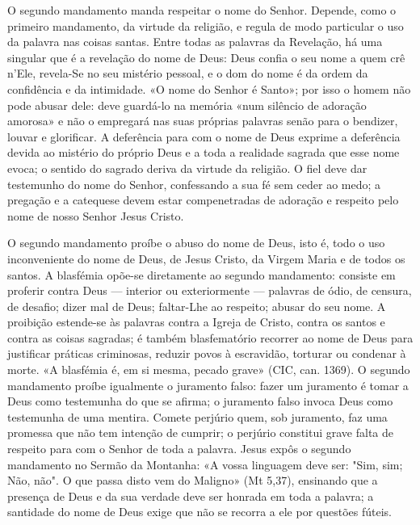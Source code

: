 O segundo mandamento manda respeitar o nome do Senhor. Depende, como o primeiro mandamento, da virtude da religião, e regula de modo particular o uso da palavra nas coisas santas. Entre todas as palavras da Revelação, há uma singular que é a revelação do nome de Deus: Deus confia o seu nome a quem crê n'Ele, revela-Se no seu mistério pessoal, e o dom do nome é da ordem da confidência e da intimidade. «O nome do Senhor é Santo»; por isso o homem não pode abusar dele: deve guardá-lo na memória «num silêncio de adoração amorosa» e não o empregará nas suas próprias palavras senão para o bendizer, louvar e glorificar. A deferência para com o nome de Deus exprime a deferência devida ao mistério do próprio Deus e a toda a realidade sagrada que esse nome evoca; o sentido do sagrado deriva da virtude da religião. O fiel deve dar testemunho do nome do Senhor, confessando a sua fé sem ceder ao medo; a pregação e a catequese devem estar compenetradas de adoração e respeito pelo nome de nosso Senhor Jesus Cristo.

O segundo mandamento proíbe o abuso do nome de Deus, isto é, todo o uso inconveniente do nome de Deus, de Jesus Cristo, da Virgem Maria e de todos os santos. A blasfémia opõe-se diretamente ao segundo mandamento: consiste em proferir contra Deus --- interior ou exteriormente --- palavras de ódio, de censura, de desafio; dizer mal de Deus; faltar-Lhe ao respeito; abusar do seu nome. A proibição estende-se às palavras contra a Igreja de Cristo, contra os santos e contra as coisas sagradas; é também blasfematório recorrer ao nome de Deus para justificar práticas criminosas, reduzir povos à escravidão, torturar ou condenar à morte. «A blasfémia é, em si mesma, pecado grave» (CIC, can. 1369). O segundo mandamento proíbe igualmente o juramento falso: fazer um juramento é tomar a Deus como testemunha do que se afirma; o juramento falso invoca Deus como testemunha de uma mentira. Comete perjúrio quem, sob juramento, faz uma promessa que não tem intenção de cumprir; o perjúrio constitui grave falta de respeito para com o Senhor de toda a palavra. Jesus expôs o segundo mandamento no Sermão da Montanha: «A vossa linguagem deve ser: "Sim, sim; Não, não". O que passa disto vem do Maligno» (Mt 5,37), ensinando que a presença de Deus e da sua verdade deve ser honrada em toda a palavra; a santidade do nome de Deus exige que não se recorra a ele por questões fúteis.

